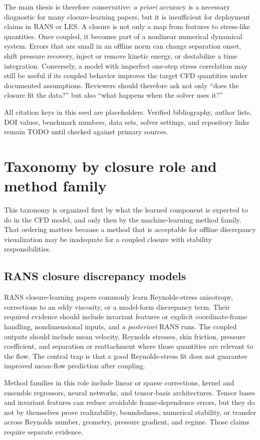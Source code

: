 \documentclass[11pt]{article}
\newcommand{\apriori}{\textit{a priori}}
\newcommand{\aposteriori}{\textit{a posteriori}}
\begin{document}
The main thesis is therefore conservative: \apriori{} accuracy is a necessary diagnostic for many closure-learning papers, but it is insufficient for deployment claims in RANS or LES. A closure is not only a map from features to stress-like quantities. Once coupled, it becomes part of a nonlinear numerical dynamical system. Errors that are small in an offline norm can change separation onset, shift pressure recovery, inject or remove kinetic energy, or destabilize a time integration. Conversely, a model with imperfect one-step stress correlation may still be useful if its coupled behavior improves the target CFD quantities under documented assumptions. Reviewers should therefore ask not only ``does the closure fit the data?'' but also ``what happens when the solver uses it?''

All citation keys in this seed are placeholders. Verified bibliography, author lists, DOI values, benchmark numbers, data sets, solver settings, and repository links remain TODO until checked against primary sources.

\section{Taxonomy by closure role and method family}

This taxonomy is organized first by what the learned component is expected to do in the CFD model, and only then by the machine-learning method family. That ordering matters because a method that is acceptable for offline discrepancy visualization may be inadequate for a coupled closure with stability responsibilities.

\subsection{RANS closure discrepancy models}

RANS closure-learning papers commonly learn Reynolds-stress anisotropy, corrections to an eddy viscosity, or a model-form discrepancy term. Their required evidence should include invariant features or explicit coordinate-frame handling, nondimensional inputs, and \aposteriori{} RANS runs. The coupled outputs should include mean velocity, Reynolds stresses, skin friction, pressure coefficient, and separation or reattachment where those quantities are relevant to the flow. The central trap is that a good Reynolds-stress fit does not guarantee improved mean-flow prediction after coupling.

Method families in this role include linear or sparse corrections, kernel and ensemble regressors, neural networks, and tensor-basis architectures. Tensor bases and invariant features can reduce avoidable frame-dependence errors, but they do not by themselves prove realizability, boundedness, numerical stability, or transfer across Reynolds number, geometry, pressure gradient, and regime. Those claims require separate evidence.
\end{document}
